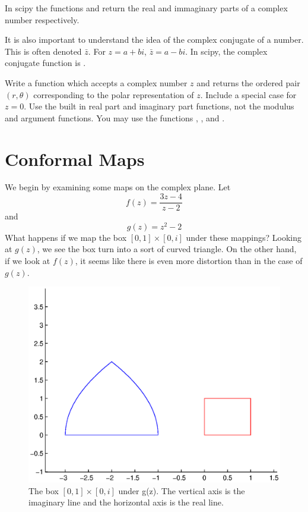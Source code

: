 In scipy the functions  and  return the real and immaginary parts of a complex number respectively. 

It is also important to understand the idea of the complex conjugate of a number. This is often denoted $\bar{z}$. For $z=a+bi$, $\bar{z}=a-bi$. In scipy, the complex conjugate function is . 

\begin{problem}
Write a function which accepts a complex number $z$ and returns the ordered pair $(r,\theta)$ corresponding to the polar representation of $z$. Include a special case for $z=0$. Use the built in real part and imaginary part functions, not the modulus and argument functions. You may use the functions , , and  .
\end{problem}

\section*{Conformal Maps}

We begin by examining some maps on the complex plane.  Let
\[
f(z) = \frac{3z - 4}{z - 2}
\]
and
\[
g(z) = z^2 - 2
\]
What happens if we map the box $[0,1]\times[0,i]$ under these mappings?  
\newpage
Looking at $g(z)$, we see the box turn into a sort of curved triangle.  On the other hand, if we look at $f(z)$, it seems like there is even more distortion than in the case of $g(z)$.
\begin{figure}
\begin{center}
\includegraphics[scale=0.5]{map1}
\caption{The box $[0,1]\times[0,i]$ under g(z).  The vertical axis is the imaginary line and the horizontal axis is the real line.}
\end{center}
\end{figure}

